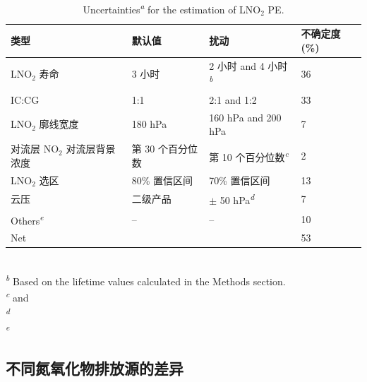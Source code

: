 \begin{table}[!htbp]
\centering
\caption{Uncertainties\textsuperscript{\emph{a}} for the estimation of LNO$_2$ PE.}
\label{table:arctic_uncertainty}
\begin{tabular}{llll}
\hline
类型                           &  默认值        & 扰动                 &   不确定度 (\%)  \\
\hline
LNO$_2$ 寿命                   & 3 小时                 & 2 小时 and 4 小时\textsuperscript{\emph{b}}      &   36                      \\
IC:CG                         & 1:1                    & 2:1 and 1:2                  &   33 \\
LNO$_2$ 廓线宽度                & 180 hPa               & 160 hPa and 200 hPa          &   7   \\
对流层 NO$_2$ 对流层背景浓度      & 第 30 个百分位数        & 第 10 个百分位数\textsuperscript{\emph{c}}     & 2                \\
LNO$_2$ 选区              & 80\% 置信区间          &  70\% 置信区间   & 13                \\
云压                 & 二级产品               &  $\pm$ 50 hPa\textsuperscript{\emph{d}}                & 7                \\
Others\textsuperscript{\emph{e}}       & --                  & --                           &   10                      \\
Net                            &                     &                              &   53                      \\
\hline
\end{tabular}
\footnotesize
{}\\
\textsuperscript{\emph{b}} Based on the lifetime values calculated in the Methods section. \\
\textsuperscript{\emph{c}} \citet{Allen.2021a} and \citet{Perez-Invernon.2022}  \\
\textsuperscript{\emph{d}} \citet{VanGeffen.2022} \\
\textsuperscript{\emph{e}} \citet{Allen.2021a}
\end{table}


\subsection{不同氮氧化物排放源的差异}

